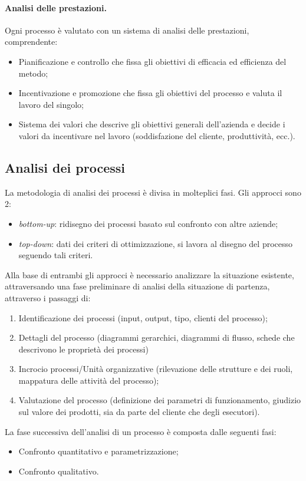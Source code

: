 \documentclass[a4paper, 11pt]{article}
\begin{document}
	\paragraph{Analisi delle prestazioni.} Ogni processo è valutato con un sistema di analisi delle prestazioni, comprendente: \begin{itemize}
		\item Pianificazione e controllo che fissa gli obiettivi di efficacia ed efficienza del metodo;
		\item Incentivazione e promozione che fissa gli obiettivi del processo e valuta il lavoro del singolo;
		\item Sistema dei valori che descrive gli obiettivi generali dell'azienda e decide i valori da incentivare nel lavoro (soddisfazione del cliente, produttività, ecc.).
	\end{itemize}

	\subsection{Analisi dei processi}
	La metodologia di analisi dei processi è divisa in molteplici fasi. Gli approcci sono 2:
	\begin{itemize}
		\item \textit{bottom-up}: ridisegno dei processi basato sul confronto con altre aziende;
		\item \textit{top-down}: dati dei criteri di ottimizzazione, si lavora al disegno del processo seguendo tali criteri.
	\end{itemize}

	Alla base di entrambi gli approcci è necessario analizzare la situazione esistente, attraversando una fase preliminare di analisi della situazione di partenza, attraverso i passaggi di:
	\begin{enumerate}
		\item Identificazione dei processi (input, output, tipo, clienti del processo);
		\item Dettagli del processo (diagrammi gerarchici, diagrammi di flusso, schede che descrivono le proprietà dei processi)
		\item Incrocio processi/Unità organizzative (rilevazione delle strutture e dei ruoli, mappatura delle attività del processo);
		\item Valutazione del processo (definizione dei parametri di funzionamento, giudizio sul valore dei prodotti, sia da parte del cliente che degli esecutori).
	\end{enumerate}

	La fase successiva dell'analisi di un processo è composta dalle seguenti fasi: \begin{itemize}
		\item Confronto quantitativo e parametrizzazione;
		\item Confronto qualitativo.
	\end{itemize}
	
	
	
	
	
	
	
	
	
\end{document}
